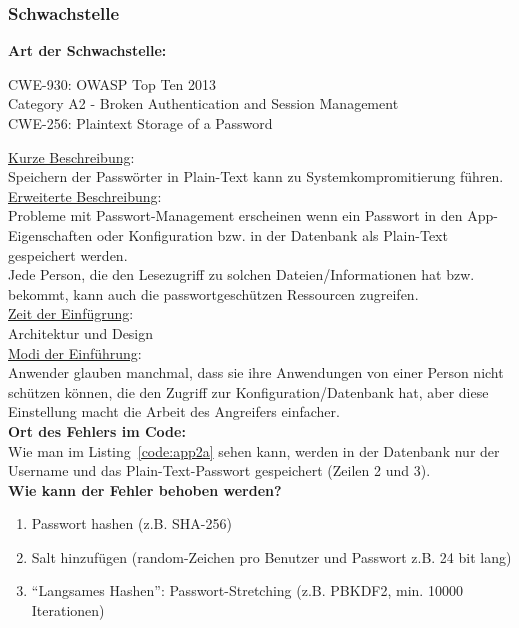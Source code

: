 \documentclass[12pt,a4paper,titlepage,oneside]{scrartcl}
\begin{document}
\subsubsection{Schwachstelle}

\textbf{Art der Schwachstelle:}
\begin{center}
CWE-930: OWASP Top Ten 2013 \\
Category A2 - Broken Authentication and Session Management \\
CWE-256: Plaintext Storage of a Password
\end{center}
\underline{Kurze Beschreibung}: \\[0.5em]
Speichern der Passwörter in Plain-Text kann zu Systemkompromitierung führen. \\[0.5em]
\underline{Erweiterte Beschreibung}: \\[0.5em]
Probleme mit Passwort-Management erscheinen wenn ein Passwort in den App-Eigenschaften oder Konfiguration bzw. in der Datenbank als Plain-Text gespeichert werden. \\
Jede Person, die den Lesezugriff zu solchen Dateien/Informationen hat bzw. bekommt, kann auch die passwortgeschützen Ressourcen zugreifen. \\[0.5em]
\underline{Zeit der Einfügrung}: \\[0.5em]
Architektur und Design \\[0.5em]
\underline{Modi der Einführung}: \\[0.5em]
Anwender glauben manchmal, dass sie ihre Anwendungen von einer Person nicht schützen können, die den Zugriff zur Konfiguration/Datenbank hat, aber diese Einstellung macht die Arbeit des Angreifers einfacher. \\[1em]
\textbf{Ort des Fehlers im Code:} \\[0.5em]
Wie man im Listing~\ref*{code:app2a} sehen kann, werden in der Datenbank nur der Username und das Plain-Text-Passwort gespeichert (Zeilen 2 und 3). \\[1em]
\textbf{Wie kann der Fehler behoben werden?}
\begin{enumerate}
	\item Passwort hashen (z.B. SHA-256)
	\item Salt hinzufügen (random-Zeichen pro Benutzer und Passwort z.B. 24 bit lang)
	\item "`Langsames Hashen"': Passwort-Stretching (z.B. PBKDF2, min. 10000 Iterationen)
\end{enumerate}
\end{document}
